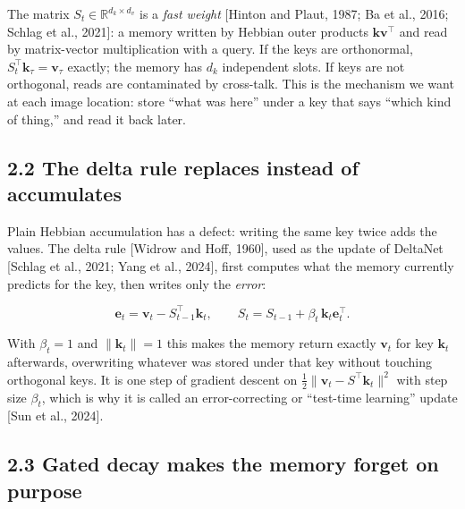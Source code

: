 \documentclass[

]{article}
\begin{document}
The matrix \(S_t\in\mathbb{R}^{d_k\times d_v}\) is a \emph{fast weight} {[}Hinton and Plaut, 1987; Ba et al., 2016; Schlag et al., 2021{]}: a memory written by Hebbian outer products \(\mathbf{k}\mathbf{v}^\top\) and read by matrix-vector multiplication with a query. If the keys are orthonormal, \(S_t^\top\mathbf{k}_\tau=\mathbf{v}_\tau\) exactly; the memory has \(d_k\) independent slots. If keys are not orthogonal, reads are contaminated by cross-talk. This is the mechanism we want at each image location: store ``what was here'' under a key that says ``which kind of thing,'' and read it back later.



\subsection{2.2 The delta rule replaces instead of accumulates}\label{the-delta-rule-replaces-instead-of-accumulates}



Plain Hebbian accumulation has a defect: writing the same key twice adds the values. The delta rule {[}Widrow and Hoff, 1960{]}, used as the update of DeltaNet {[}Schlag et al., 2021; Yang et al., 2024{]}, first computes what the memory currently predicts for the key, then writes only the \emph{error}:



\[

\mathbf{e}_t=\mathbf{v}_t-S_{t-1}^\top\mathbf{k}_t,\qquad

S_t=S_{t-1}+\beta_t\,\mathbf{k}_t\mathbf{e}_t^\top .

\]



With \(\beta_t=1\) and \(\|\mathbf{k}_t\|=1\) this makes the memory return exactly \(\mathbf{v}_t\) for key \(\mathbf{k}_t\) afterwards, overwriting whatever was stored under that key without touching orthogonal keys. It is one step of gradient descent on \(\tfrac12\|\mathbf{v}_t-S^\top\mathbf{k}_t\|^2\) with step size \(\beta_t\), which is why it is called an error-correcting or ``test-time learning'' update {[}Sun et al., 2024{]}.



\subsection{2.3 Gated decay makes the memory forget on purpose}\label{gated-decay-makes-the-memory-forget-on-purpose}
\end{document}
